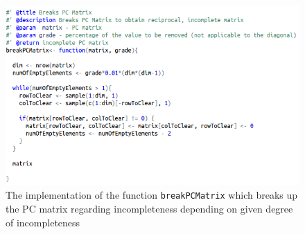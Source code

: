 \begin{figure}[h]
\centerline{\includegraphics[scale=0.73]{images/kod13.png}}
\caption{The implementation of the function \texttt{breakPCMatrix} which breaks up the PC matrix regarding incompleteness depending on given degree of incompleteness}
\label{fig:rstudio}
\end{figure}
